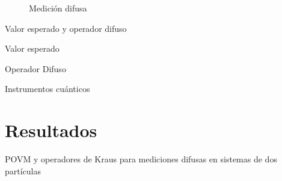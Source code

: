 \documentclass[svgnames,12pt,aspectratio=149]{beamer}
\begin{document}
\begin{frame}   \begin{figure}[H]
\centering
{}

\caption{Medición difusa}\label{fig:lego}
\end{figure} 

    
\end{frame}

\begin{frame}{Valor esperado y operador difuso}
    \begin{block}{Valor esperado}
      
    \end{block}
    \begin{block}{Operador Difuso}
      
    \end{block}
\end{frame}

\begin{frame}{Instrumentos cuánticos}
    
\end{frame}


\section{Resultados}
\begin{frame}{POVM y operadores de Kraus para mediciones difusas en sistemas de dos partículas}
    
\end{frame}
\end{document}
